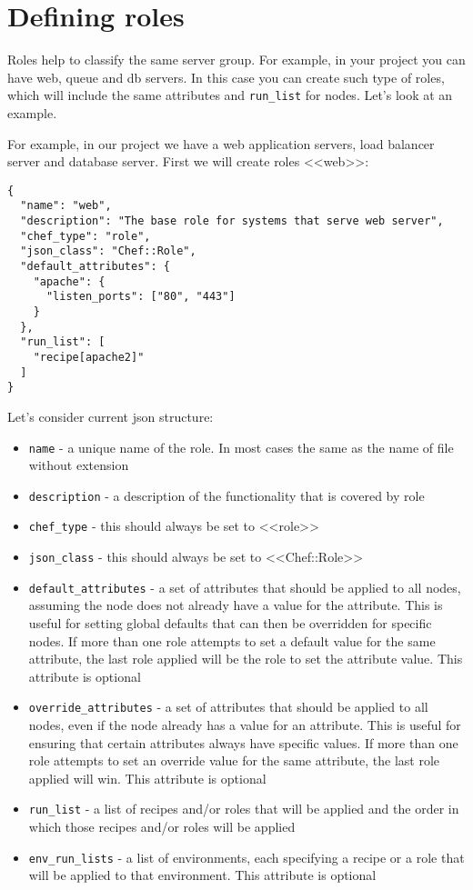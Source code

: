 \section{Defining roles}
\label{sec:solo-role}

Roles help to classify the same server group. For example, in your project you can have web, queue and db servers. In this case you can create such type of roles, which will include the same attributes and \lstinline!run_list! for nodes. Let's look at an example.

For example, in our project we have a web application servers, load balancer server and database server. First we will create roles <<web>>:

\begin{lstlisting}[label=lst:my-cloud-role1,title=my-cloud/roles/web.json]
{
  "name": "web",
  "description": "The base role for systems that serve web server",
  "chef_type": "role",
  "json_class": "Chef::Role",
  "default_attributes": {
    "apache": {
      "listen_ports": ["80", "443"]
    }
  },
  "run_list": [
    "recipe[apache2]"
  ]
}
\end{lstlisting}

Let's consider current json structure:

\begin{itemize}
  \item \lstinline!name! - a unique name of the role. In most cases the same as the name of file without extension
  \item \lstinline!description! - a description of the functionality that is covered by role
  \item \lstinline!chef_type! - this should always be set to <<role>>
  \item \lstinline!json_class! - this should always be set to <<Chef::Role>>
  \item \lstinline!default_attributes! - a set of attributes that should be applied to all nodes, assuming the node does not already have a value for the attribute. This is useful for setting global defaults that can then be overridden for specific nodes. If more than one role attempts to set a default value for the same attribute, the last role applied will be the role to set the attribute value. This attribute is optional
  \item \lstinline!override_attributes! - a set of attributes that should be applied to all nodes, even if the node already has a value for an attribute. This is useful for ensuring that certain attributes always have specific values. If more than one role attempts to set an override value for the same attribute, the last role applied will win. This attribute is optional
  \item \lstinline!run_list! - a list of recipes and/or roles that will be applied and the order in which those recipes and/or roles will be applied
  \item \lstinline!env_run_lists! - a list of environments, each specifying a recipe or a role that will be applied to that environment. This attribute is optional
\end{itemize}

